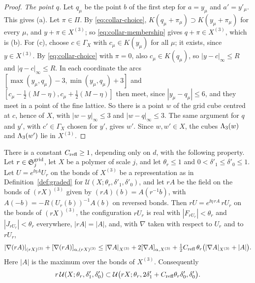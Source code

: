 \begin{proof}
\emph{The point $q$.} Let $q_\mu$ be the point $b$ of the first step for $a=y_\mu$ and $a'=y'_\mu$. This gives (a). Let $\pi\in\Pi$. By \eqref{eq:collar-choice}, $K(q_\mu+\pi_\mu)\supset K(y_\mu+\pi_\mu)$ for every $\mu$, and $y+\pi\in X^{(3)}$; so \eqref{eq:collar-membership} gives $q+\pi\in X^{(3)}$, which is (b). For (c), choose $c\in\Gamma_X$ with $c_\mu\in K(y_\mu)$ for all $\mu$; it exists, since $y\in X^{(3)}$. By \eqref{eq:collar-choice} with $\pi=0$, also $c_\mu\in K(q_\mu)$, so $|y-c|_\infty\le R$ and $|q-c|_\infty\le R$. In each coordinate the arcs $[\max(y_\mu,q_\mu)-3,\min(y_\mu,q_\mu)+3]$ and $[c_\mu-\frac12(M-\eta),c_\mu+\frac12(M-\eta)]$ then meet, since $|y_\mu-q_\mu|\le6$, and they meet in a point of the fine lattice. So there is a point $w$ of the grid cube centred at $c$, hence of $X$, with $|w-y|_\infty\le3$ and $|w-q|_\infty\le3$. The same argument for $q$ and $y'$, with $c'\in\Gamma_X$ chosen for $y'$, gives $w'$. Since $w,w'\in X$, the cubes $\Lambda_3(w)$ and $\Lambda_3(w')$ lie in $X^{(3)}$.
\end{proof}

\begin{lemma}\label{lem:grid-domains}
There is a constant $C_{\rm refl}\ge1$, depending only on $d$, with the following property. Let $r\in\mathfrak S^{\rm grid}_j$, let $X$ be a polymer of scale $j$, and let $\theta_r\le1$ and $0<\delta'_1\le\delta'_0\le1$. Let $U=e^{\ii\eta A}U_r$ on the bonds of $X^{(3)}$ be a representation as in Definition~\ref{def:graded} for $\mathcal U(X;\theta_r,\delta'_1,\delta'_0)$, and let $rA$ be the field on the bonds of $(rX)^{(3)}$ given by $(rA)(b)=A(r^{-1}b)$, with $A(-b)=-R(U_r(b))^{-1}A(b)$ on reversed bonds. Then $rU=e^{\ii\eta\,rA}\,rU_r$ on the bonds of $(rX)^{(3)}$, the configuration $rU_r$ is real with $|F_{rU_r}|<\theta_r$ and $|J_{rU_r}|<\theta_r$ everywhere, $|rA|=|A|$, and, with $\nabla$ taken with respect to $U_r$ and to $rU_r$,
\begin{equation}\label{eq:grid-domains}
|\nabla(rA)|_{(rX)^{(3)}}+[\nabla(rA)]_{\alpha,(rX)^{(3)}}\le|\nabla A|_{X^{(3)}}+2[\nabla A]_{\alpha,X^{(3)}}+\tfrac12C_{\rm refl}\,\theta_r\big(|\nabla A|_{X^{(3)}}+|A|\big).
\end{equation}
Here $|A|$ is the maximum over the bonds of $X^{(3)}$. Consequently
\[
r\,\mathcal U(X;\theta_r,\delta'_1,\delta'_0)\subset\mathcal U\big(rX;\theta_r,2\delta'_1+C_{\rm refl}\theta_r\delta'_0,\delta'_0\big).
\]
\end{lemma}

